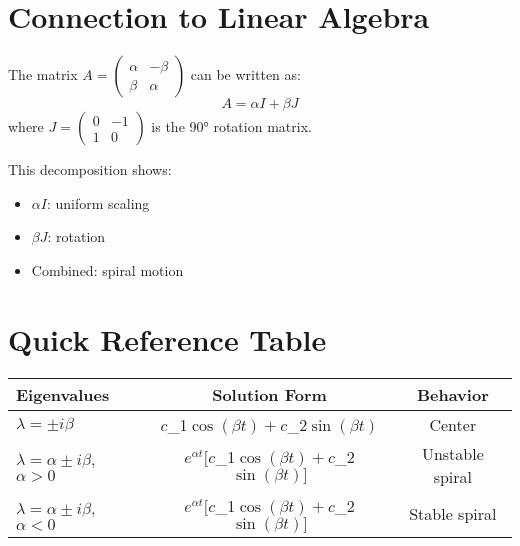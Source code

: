 \documentclass[12pt]{article}
\begin{document}
\section{Connection to Linear Algebra}

The matrix $A = \begin{pmatrix} \alpha & -\beta \\ \beta & \alpha \end{pmatrix}$ can be written as:
\[A = \alpha I + \beta J\]
where $J = \begin{pmatrix} 0 & -1 \\ 1 & 0 \end{pmatrix}$ is the 90° rotation matrix.

This decomposition shows:
\begin{itemize}
\item $\alpha I$: uniform scaling
\item $\beta J$: rotation
\item Combined: spiral motion
\end{itemize}

\section{Quick Reference Table}

\begin{center}
\begin{tabular}{|l|c|c|}
\hline
\textbf{Eigenvalues} & \textbf{Solution Form} & \textbf{Behavior} \\
\hline
$\lambda = \pm i\beta$ & $c$_{1}$\cos(\beta t) + c$_{2}$\sin(\beta t)$ & Center \\
$\lambda = \alpha \pm i\beta$, $\alpha > 0$ & $e^{\alpha t}[c$_{1}$\cos(\beta t) + c$_{2}$\sin(\beta t)]$ & Unstable spiral \\
$\lambda = \alpha \pm i\beta$, $\alpha < 0$ & $e^{\alpha t}[c$_{1}$\cos(\beta t) + c$_{2}$\sin(\beta t)]$ & Stable spiral \\
\hline
\end{tabular}
\end{center}
\end{document}
